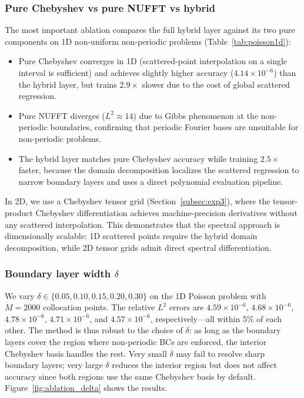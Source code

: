 \documentclass[sn-mathphys,Numbered]{sn-jnl}
\theoremstyle{thmstyleone}
\theoremstyle{thmstyletwo}
\theoremstyle{thmstylethree}
\begin{document}
\subsubsection{Pure Chebyshev vs pure NUFFT vs hybrid}
The most important ablation compares the full hybrid layer against its two pure components on 1D non-uniform non-periodic problems (Table~\ref{tab:poisson1d}):
\begin{itemize}
    \item Pure Chebyshev converges in 1D (scattered-point interpolation on a single interval is sufficient) and achieves slightly higher accuracy ($4.14\times10^{-6}$) than the hybrid layer, but trains $2.9\times$ slower due to the cost of global scattered regression.
    \item Pure NUFFT diverges ($L^2\approx14$) due to Gibbs phenomenon at the non-periodic boundaries, confirming that periodic Fourier bases are unsuitable for non-periodic problems.
    \item The hybrid layer matches pure Chebyshev accuracy while training $2.5\times$ faster, because the domain decomposition localizes the scattered regression to narrow boundary layers and uses a direct polynomial evaluation pipeline.
\end{itemize}
In 2D, we use a Chebyshev tensor grid (Section~\ref{subsec:exp3}), where the tensor-product Chebyshev differentiation achieves machine-precision derivatives without any scattered interpolation. This demonstrates that the spectral approach is dimensionally scalable: 1D scattered points require the hybrid domain decomposition, while 2D tensor grids admit direct spectral differentiation.

\subsubsection{Boundary layer width $\delta$}
We vary $\delta \in \{0.05, 0.10, 0.15, 0.20, 0.30\}$ on the 1D Poisson problem with $M=2000$ collocation points. The relative $L^2$ errors are $4.59\times10^{-6}$, $4.68\times10^{-6}$, $4.78\times10^{-6}$, $4.71\times10^{-6}$, and $4.57\times10^{-6}$, respectively---all within 5\% of each other. The method is thus robust to the choice of $\delta$: as long as the boundary layers cover the region where non-periodic BCs are enforced, the interior Chebyshev basis handles the rest. Very small $\delta$ may fail to resolve sharp boundary layers; very large $\delta$ reduces the interior region but does not affect accuracy since both regions use the same Chebyshev basis by default. Figure~\ref{fig:ablation_delta} shows the results.
\end{document}
